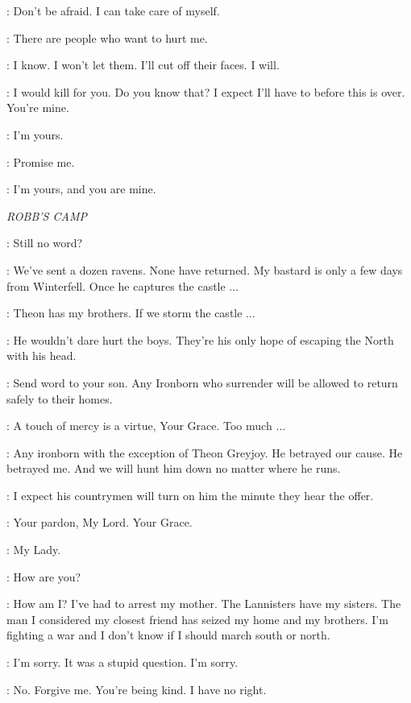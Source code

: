 \SHAE: Don't be afraid. I can take care of myself. 

\TYRION: There are people who want to hurt me. 

\SHAE: I know. I won't let them. I'll cut off their faces. I will. 

\TYRION: I would kill for you. Do you know that? I expect I'll have to before this is over. You're mine. 

\SHAE: I'm yours. 

\TYRION: Promise me. 

\SHAE: I'm yours, and you are mine. 


\scene

\textit{ROBB'S CAMP} 


\ROBB: Still no word? 

\ROOSE: We've sent a dozen ravens. None have returned. My bastard is only a few days from Winterfell. Once he captures the castle $\ldots$  

\ROBB: Theon has my brothers. If we storm the castle $\ldots$  

\ROOSE: He wouldn't dare hurt the boys. They're his only hope of escaping the North with his head. 

\ROBB: Send word to your son. Any Ironborn who surrender will be allowed to return safely to their homes. 

\ROOSE: A touch of mercy is a virtue, Your Grace. Too much $\ldots$  

\ROBB: Any ironborn with the exception of Theon Greyjoy. He betrayed our cause. He betrayed me. And we will hunt him down no matter where he runs. 

\ROOSE: I expect his countrymen will turn on him the minute they hear the offer. 


\TALISA: Your pardon, My Lord. Your Grace. 

\ROOSE: My Lady. 


\TALISA: How are you? 

\ROBB: How am I? I've had to arrest my mother. The Lannisters have my sisters. The man I considered my closest friend has seized my home and my brothers. I'm fighting a war and I don't know if I should march south or north. 

\TALISA: I'm sorry. It was a stupid question. I'm sorry. 

\ROBB: No. Forgive me. You're being kind. I have no right. 

